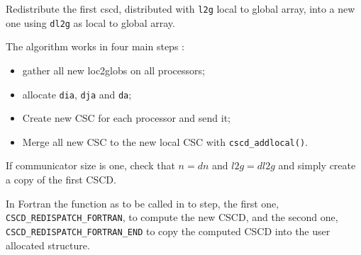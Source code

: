          {
           Redistribute the first cscd, distributed with \texttt{l2g}
           local to global array, into a new one using \texttt{dl2g}
           as local to global array.
           
           The algorithm works in four main steps :
           \begin{itemize}
           \item gather all new loc2globs on all processors;
           \item allocate \texttt{dia}, \texttt{dja} and \texttt{da};
           \item Create new CSC for each processor and send it;
           \item Merge all new CSC to the new local CSC with \texttt{cscd\_addlocal()}.
           \end{itemize}
           
           If communicator size is one, check that $n = dn$ and 
           $l2g = dl2g$ and simply create a copy of the first CSCD.

           In Fortran the function as to be called in to step, the
           first one, \texttt{CSCD\_REDISPATCH\_FORTRAN}, to compute the
           new CSCD, and the second one,
           \texttt{CSCD\_REDISPATCH\_FORTRAN\_END} to copy the
           computed CSCD into the user allocated structure.
}
